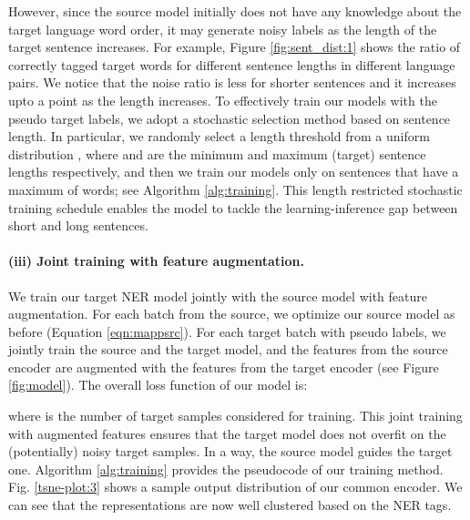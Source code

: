 \documentclass[letterpaper]{article} \usepackage{aaai20}  \usepackage{times}  \usepackage{helvet} \usepackage{courier}  \usepackage[hyphens]{url}  \usepackage{graphicx} \urlstyle{rm} \def\UrlFont{\rm}  \usepackage{graphicx}  \frenchspacing  \setlength{\pdfpagewidth}{8.5in}  \setlength{\pdfpageheight}{11in}
\begin{document}
However, since the source model initially does not have any knowledge about the target language word order, it may generate noisy labels as the length of the target sentence increases. For example, Figure \ref{fig:sent_dist:1} shows the ratio of correctly tagged target words for different sentence lengths in different language pairs. We notice that the noise ratio is less for shorter sentences and it increases upto a point as the length increases. To effectively train our models with the pseudo target labels, we adopt a stochastic selection method based on sentence length. In particular, we randomly select a length threshold  from a uniform distribution , where  and  are the minimum and maximum (target) sentence lengths respectively, and then we train our models only on sentences that have a maximum of  words; see Algorithm \ref{alg:training}. This length restricted stochastic training schedule enables the model to tackle the learning-inference gap between short and long sentences.





\paragraph{(iii) Joint training with feature augmentation.} We train our target NER model jointly with the  source model with feature augmentation. For each batch from the source, we optimize our source model as before (Equation \ref{eqn:mappsrc}). For each target batch with pseudo labels, we jointly train the source and the target model, and the features from the source encoder are augmented with the features from the target encoder (see Figure \ref{fig:model}). The overall loss function of our model is:

\noindent where  is the number of target samples considered for training. This joint training with augmented features ensures that the target model does not overfit on the (potentially) noisy target samples. In a way, the source model guides the target one. Algorithm \ref{alg:training} provides the pseudocode of our training method. Fig.  \ref{tsne-plot:3} shows a sample output distribution of our common encoder. We can see that the representations are now well clustered based on the NER tags.
\end{document}
